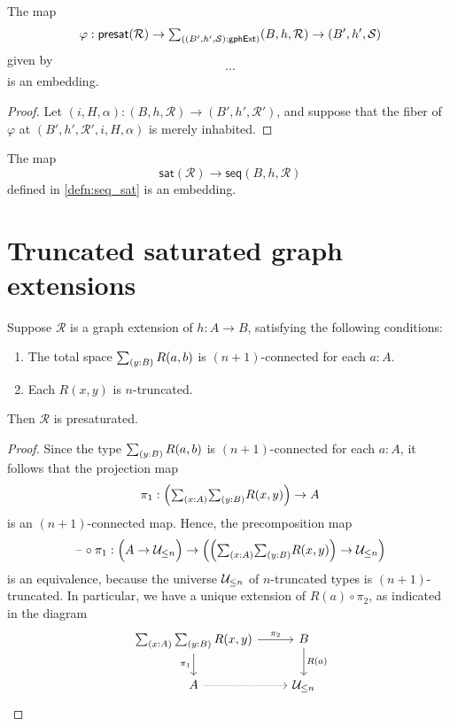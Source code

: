 \begin{lem}
The map
\begin{equation*}
\varphi:\mathsf{presat}(\mathcal{R})\to \sm{(B',h',\mathcal{S}):\mathsf{gphExt}}(B,h,\mathcal{R})\to(B',h',\mathcal{S})
\end{equation*}
given by
\begin{equation*}
\cdots
\end{equation*}
is an embedding.
\end{lem}

\begin{proof}
Let $(i,H,\alpha):(B,h,\mathcal{R})\to(B',h',\mathcal{R}')$, and suppose that the fiber of $\varphi$ at $(B',h',\mathcal{R}',i,H,\alpha)$ is merely inhabited. 
\end{proof}

\begin{cor}
The map
\begin{equation*}
\mathsf{sat}(\mathcal{R})\to\mathsf{seq}(B,h,\mathcal{R})
\end{equation*}
defined in \autoref{defn:seq_sat} is an embedding.
\end{cor}

\section{Truncated saturated graph extensions}

\begin{lem}
Suppose $\mathcal{R}$ is a graph extension of $h:A\to B$, satisfying the following conditions:
\begin{enumerate}
\item The total space $\sm{y:B}R(a,b)$ is $(n+1)$-connected for each $a:A$.
\item Each $R(x,y)$ is $n$-truncated.
\end{enumerate}
Then $\mathcal{R}$ is presaturated. 
\end{lem}

\begin{proof}
Since the type $\sm{y:B}R(a,b)$ is $(n+1)$-connected for each $a:A$, it follows that the projection map
\begin{equation*}
\pi_1 : \Big(\sm{x:A}{y:B}R(x,y)\Big)\to A
\end{equation*}
is an $(n+1)$-connected map. Hence, the precomposition map
\begin{equation*}
\blank\circ\pi_1 : \Big(A\to \UU_{\leq n}\Big)\to \Big(\Big(\sm{x:A}{y:B}R(x,y)\Big)\to \UU_{\leq n}\Big)
\end{equation*}
is an equivalence, because the universe $\mathcal{U}_{\leq n}$ of $n$-truncated types is $(n+1)$-truncated.
In particular, we have a unique extension of $R(a)\circ \pi_2$, as indicated in the diagram
\begin{equation*}
\begin{tikzcd}
\sm{x:A}{y:B}R(x,y) \arrow[r,"\pi_2"] \arrow[d,swap,"\pi_1"] & B \arrow[d,"R(a)"] \\
A \arrow[r,densely dotted] & \UU_{\leq n}
\end{tikzcd}
\end{equation*}
\end{proof}

